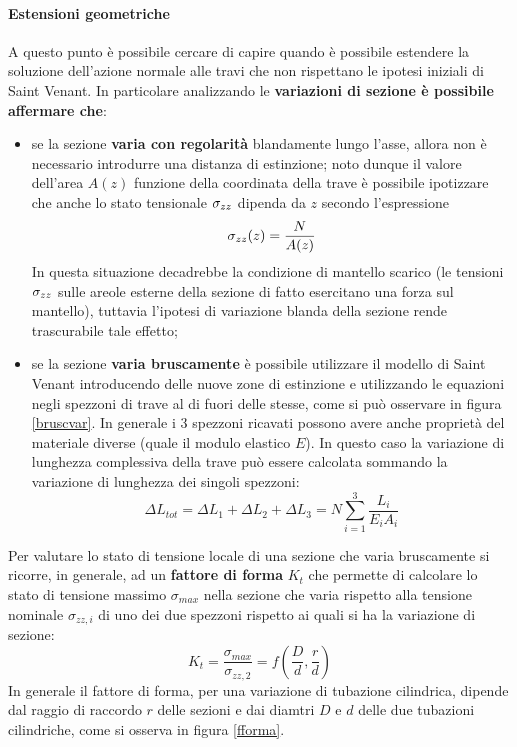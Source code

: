 		\paragraph{Estensioni geometriche} A questo punto è possibile cercare di capire quando è possibile estendere la soluzione dell'azione normale alle travi che non rispettano le ipotesi iniziali di Saint Venant. In particolare analizzando le \textbf{variazioni di sezione è possibile affermare che}:
		\begin{itemize}
			\item se la sezione \textbf{varia con regolarità} blandamente lungo l'asse, allora non è necessario introdurre una distanza di estinzione; noto dunque il valore dell'area $A(z)$ funzione della coordinata della trave è possibile ipotizzare che anche lo stato tensionale $\sigma_{zz}$ dipenda da $z$ secondo l'espressione
			\[ \sigma_{zz} (z) = \frac N {A(z)} \]
			In questa situazione decadrebbe la condizione di mantello scarico (le tensioni $\sigma_{zz}$ sulle areole esterne della sezione di fatto esercitano una forza sul mantello), tuttavia l'ipotesi di variazione blanda della sezione rende trascurabile tale effetto;
			
			\item se la sezione \textbf{varia bruscamente} è possibile utilizzare il modello di Saint Venant introducendo delle nuove  zone di estinzione e utilizzando le equazioni negli spezzoni di trave al di fuori delle stesse, come si può osservare in figura \ref{bruscvar}. In generale i 3 spezzoni ricavati possono avere anche proprietà del materiale diverse (quale il modulo elastico $E$). In questo caso la variazione di lunghezza complessiva  della trave può essere calcolata sommando la variazione di lunghezza dei singoli spezzoni:
			\[ \Delta L_{tot} = \Delta L_1 + \Delta L_2 + \Delta L_3 = N \sum_{i=1}^{3} \frac{L_i}{E_iA_i} \]
			
		\end{itemize}
		
		
		\begin{concetto}
			Per valutare lo stato di tensione locale di una sezione che varia bruscamente si ricorre, in generale, ad un \textbf{fattore di forma} $K_t$ che permette di calcolare lo stato di tensione massimo $\sigma_{max}$ nella sezione che varia rispetto alla tensione nominale $\sigma_{zz,i}$ di uno dei due spezzoni rispetto ai quali si ha la variazione di sezione:
			\begin{equation}
				K_t = \frac{\sigma_{max}}{\sigma_{zz,2}} = f\left(\frac D d, \frac r d\right)
			\end{equation}
			In generale il fattore di forma, per una variazione di tubazione cilindrica, dipende dal raggio di raccordo $r$ delle sezioni e dai diamtri $D$ e $d$ delle due tubazioni cilindriche, come si osserva in figura \ref{fforma}.
		\end{concetto}
	
